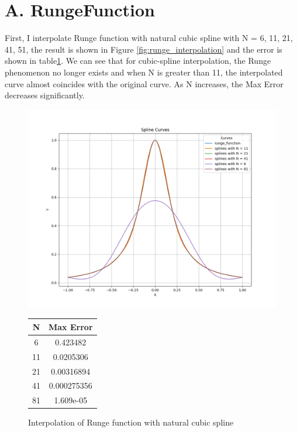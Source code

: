 \documentclass[a4paper]{article}
\begin{document}
\section*{A. RungeFunction}
First, I interpolate Runge function with natural cubic spline with N = 6, 11, 21, 41, 51, the result is shown in Figure \ref{fig:runge_interpolation} and the error is shown in table\ref{tab:max_error}.
We can see that for cubic-spline interpolation, the Runge phenomenon no longer exists and when N is greater than 11, the interpolated curve almost coincides with the original curve. As N increases, the Max Error decreases significantly.
\begin{figure}[h]
  \centering
  \begin{minipage}{0.6\textwidth} %
    \centering
    \includegraphics[width=\linewidth]{figures/A.png}
    \caption{Interpolation of Runge function with natural cubic spline}
    \label{fig:runge_interpolation}
  \end{minipage}
  \hfill 
  \begin{minipage}{0.35\textwidth} %
    \centering
    \renewcommand{\arraystretch}{1.2} %
    \begin{tabular}{|c|c|}
      \hline
      \textbf{N} & \textbf{Max Error} \\ \hline
      6  & 0.423482    \\ \hline
      11 & 0.0205306   \\ \hline
      21 & 0.00316894  \\ \hline
      41 & 0.000275356 \\ \hline
      81 & 1.609e-05   \\ \hline
    \end{tabular}
    \label{tab:max_error}
  \end{minipage}
\end{figure}
\end{document}
